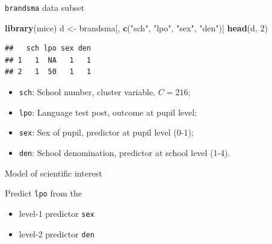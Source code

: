\documentclass[ignorenonframetext,aspectratio=43]{beamer}
\newenvironment{Shaded}{\begin{snugshade}}{\end{snugshade}}
\newcommand{\KeywordTok}[1]{\textcolor[rgb]{0.13,0.29,0.53}{\textbf{#1}}}
\newcommand{\DecValTok}[1]{\textcolor[rgb]{0.00,0.00,0.81}{#1}}
\newcommand{\StringTok}[1]{\textcolor[rgb]{0.31,0.60,0.02}{#1}}
\newcommand{\NormalTok}[1]{#1}
\providecommand{\tightlist}{%
  \setlength{\itemsep}{0pt}\setlength{\parskip}{0pt}}
\begin{document}
\begin{frame}[fragile]{\texttt{brandsma} data subset}

\begin{Shaded}
\begin{Highlighting}[]
\KeywordTok{library}\NormalTok{(mice)}
\NormalTok{d <-}\StringTok{ }\NormalTok{brandsma[, }\KeywordTok{c}\NormalTok{(}\StringTok{"sch"}\NormalTok{, }\StringTok{"lpo"}\NormalTok{, }\StringTok{"sex"}\NormalTok{, }\StringTok{"den"}\NormalTok{)]}
\KeywordTok{head}\NormalTok{(d, }\DecValTok{2}\NormalTok{)}
\end{Highlighting}
\end{Shaded}

\begin{verbatim}
##   sch lpo sex den
## 1   1  NA   1   1
## 2   1  50   1   1
\end{verbatim}

\begin{itemize}
\tightlist
\item
  \texttt{sch}: School number, cluster variable, \(C = 216\);
\item
  \texttt{lpo}: Language test post, outcome at pupil level;
\item
  \texttt{sex}: Sex of pupil, predictor at pupil level (0-1);
\item
  \texttt{den}: School denomination, predictor at school level (1-4).
\end{itemize}

\end{frame}

\begin{frame}[fragile]{Model of scientific interest}

Predict \texttt{lpo} from the

\begin{itemize}
\tightlist
\item
  level-1 predictor \texttt{sex}
\item
  level-2 predictor \texttt{den}
\end{itemize}

\end{frame}
\end{document}
